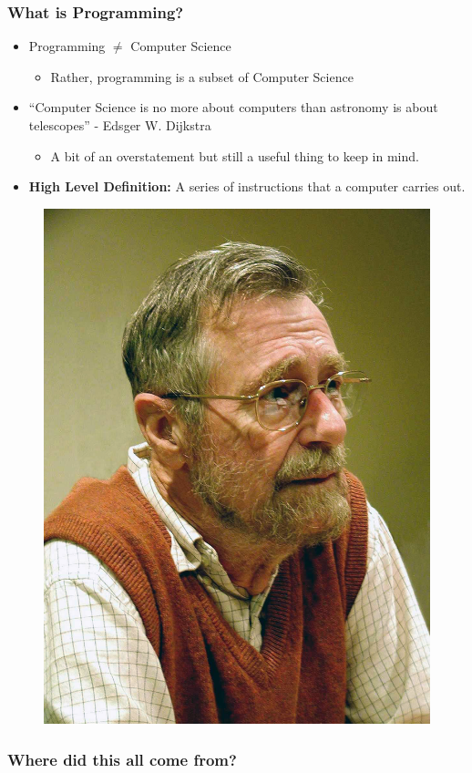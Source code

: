 \documentclass{beamer}
\begin{document}
%
%
\begin{frame}
  \frametitle{What is Programming?}
  \begin{minipage}{0.49\textwidth}
    \begin{itemize}
      \item Programming $\neq$ Computer Science
        \begin{itemize}
          \item Rather, programming is a subset of Computer Science
        \end{itemize}
      \item ``Computer Science is no more about computers than astronomy is about telescopes'' - Edsger W. Dijkstra
        \begin{itemize}
          \item A bit of an overstatement but still a useful thing to keep in mind.
        \end{itemize}
      \item \textbf{High Level Definition: } A series of instructions that a computer carries out.
    \end{itemize}
  \end{minipage}
  \begin{minipage}{0.49\textwidth}
    \begin{figure}
      \includegraphics[width=.5\textwidth]{./imgs/dijkstra.jpg}
      \label{fig:dijkstra}
    \end{figure}
  \end{minipage}
\end{frame}

%
%
\begin{frame}
  \frametitle{Where did this all come from?}
\end{frame}
\end{document}
